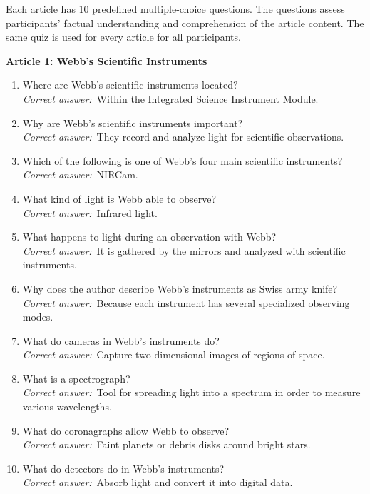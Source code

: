 \documentclass{IEEEtran}
\begin{document}
Each article has 10 predefined multiple-choice questions. The questions assess participants' factual understanding and comprehension of the article content. The same quiz is used for every article for all participants.

\textbf{Article 1: Webb's Scientific Instruments}

\begin{enumerate}
   \item Where are Webb's scientific instruments located?\\
   \textit{Correct answer:}~Within the Integrated Science Instrument Module.

    \item Why are Webb's scientific instruments important?\\
   \textit{Correct answer:}~They record and analyze light for scientific observations.

    \item Which of the following is one of Webb's four main scientific instruments?\\
   \textit{Correct answer:}~NIRCam.

    \item What kind of light is Webb able to observe?\\
   \textit{Correct answer:}~Infrared light.

    \item What happens to light during an observation with Webb?\\
   \textit{Correct answer:}~It is gathered by the mirrors and analyzed with scientific instruments.

    \item Why does the author describe Webb's instruments as Swiss army knife?\\
   \textit{Correct answer:}~Because each instrument has several specialized observing modes.

    \item What do cameras in Webb's instruments do?\\
   \textit{Correct answer:}~Capture two-dimensional images of regions of space.

    \item What is a spectrograph?\\
   \textit{Correct answer:}~Tool for spreading light into a spectrum in order to measure various wavelengths.

    \item What do coronagraphs allow Webb to observe?\\
   \textit{Correct answer:}~Faint planets or debris disks around bright stars.

    \item What do detectors do in Webb's instruments?\\
   \textit{Correct answer:}~Absorb light and convert it into digital data.

\end{enumerate}
\end{document}
